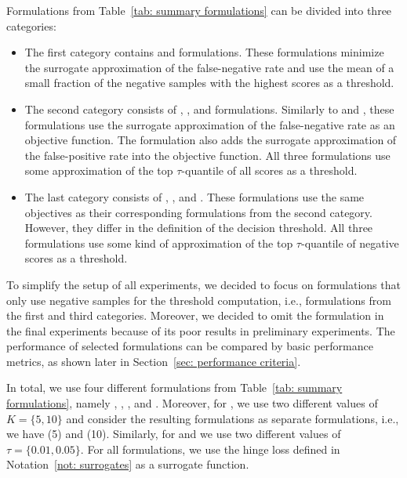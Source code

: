 Formulations from Table~\ref{tab: summary formulations} can be divided into three categories:
\begin{itemize}
  \item The first category contains \TopPush and \TopPushK formulations. These formulations minimize the surrogate approximation of the false-negative rate and use the mean of a small fraction of the negative samples with the highest scores as a threshold.
  \item The second category consists of \Grill, \TopMeanK, and \PatMat formulations. Similarly to \TopPush and \TopPushK, these formulations use the surrogate approximation of the false-negative rate as an objective function. The \Grill formulation also adds the surrogate approximation of the false-positive rate into the objective function. All three formulations use some approximation of the top $\tau$-quantile of all scores as a threshold.
  \item The last category consists of \GrillNP, \tauFPL, and \PatMatNP. These formulations use the same objectives as their corresponding formulations from the second category. However, they differ in the definition of the decision threshold. All three formulations use some kind of approximation of the top $\tau$-quantile of negative scores as a threshold.
\end{itemize}
To simplify the setup of all experiments, we decided to focus on formulations that only use negative samples for the threshold computation, i.e., formulations from the first and third categories. Moreover, we decided to omit the \GrillNP formulation in the final experiments because of its poor results in preliminary experiments. The performance of selected formulations can be compared by basic performance metrics, as shown later in Section~\ref{sec: performance criteria}.

In total, we use four different formulations from Table~\ref{tab: summary formulations}, namely \TopPush, \TopPushK, \tauFPL, and \PatMatNP. Moreover, for \TopPushK, we use two different values of~$K = \{5, 10\}$ and consider the resulting formulations as separate formulations, i.e., we have \TopPushK(5) and \TopPushK(10). Similarly, for \tauFPL and \PatMat we use two different values of~$\tau = \{0.01, 0.05\}.$ For all formulations, we use the hinge loss defined in Notation~\ref{not: surrogates} as a surrogate function.

